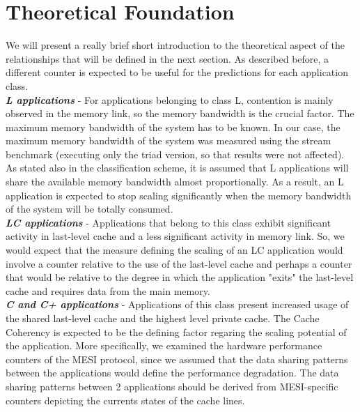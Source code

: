 \documentclass[diploma]{Styles/softlab-thesis}
\begin{document}
\section{Theoretical Foundation}

We will present a really brief short introduction to the theoretical aspect of the relationships that will be defined in the next section. As described before, a different counter is expected to be useful for the predictions for each application class. \\

\textbf{\emph{L applications}} - For applications belonging to class L, contention is mainly observed in the memory link, so the memory bandwidth is the crucial factor. The maximum memory bandwidth of the system has to be known. In our case, the maximum memory bandwidth of the system was measured using the stream benchmark \cite{reference7} (executing only the triad version, so that results were not affected). As stated also in the classification scheme, it is assumed that L applications will share the available memory bandwidth almost proportionally. As a result, an L application is expected to stop scaling significantly when the memory bandwidth of the system will be totally consumed. \\

\textbf{\emph{LC applications}} - Applications that belong to this class exhibit significant activity in last-level cache and a less significant activity in memory link. So, we would expect that the measure defining the scaling of an LC application would involve a counter relative to the use of the last-level cache and perhaps a counter that would be relative to the degree in which the application "exits" the last-level cache and requires data from the main memory. \\

\textbf{\emph{C and C+ applications}} - Applications of this class present increased usage of the shared last-level cache and the highest level private cache. The Cache Coherency is expected to be the defining factor regaring the scaling potential of the application. More specifically, we examined the hardware performance counters of the MESI protocol, since we assumed that the data sharing patterns between the applications would define the performance degradation. The data sharing patterns between 2 applications should be derived from MESI-specific counters depicting the currents states of the cache lines. \\
\end{document}
